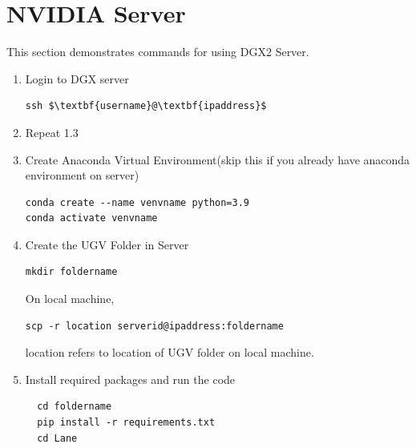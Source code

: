 \documentclass[journal,12pt,twocolumn]{IEEEtran}
\numberwithin{equation}{section}
\renewcommand\thesection{\arabic{section}}
\begin{document}
\section{NVIDIA Server}
This section demonstrates commands for using DGX2 Server.
\begin{enumerate}[label=\thesection.\arabic*.,ref=\thesection.\theenumi]
\item Login to DGX server
\begin{lstlisting}[mathescape=true]
ssh $\textbf{username}@\textbf{ipaddress}$
\end{lstlisting}
\item Repeat 1.3
\item Create Anaconda Virtual Environment(skip this if you already have anaconda environment on server)
\begin{lstlisting}
conda create --name venvname python=3.9
conda activate venvname
\end{lstlisting}
\item Create the UGV Folder in Server
\begin{lstlisting}
mkdir foldername
\end{lstlisting}
On local machine,
\begin{lstlisting}
scp -r location serverid@ipaddress:foldername
\end{lstlisting}
location refers to location of UGV folder on local machine.
\item Install required packages and run the code
\begin{lstlisting}
  cd foldername
  pip install -r requirements.txt
  cd Lane
\end{lstlisting}
\end{enumerate}
\end{document}
